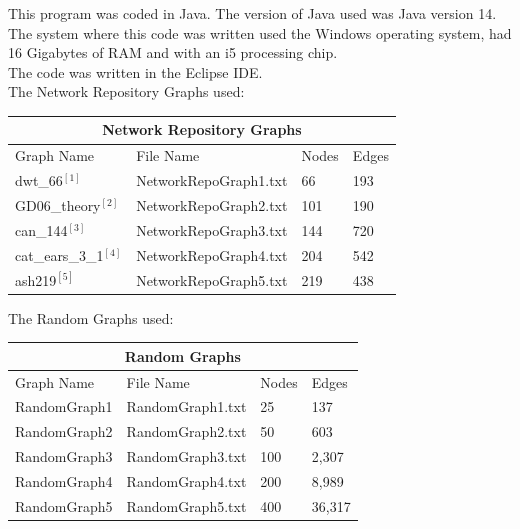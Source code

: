 \documentclass{article}
\begin{document}
\bigbreak
This program was coded in Java. The version of Java used was Java version 14.\\
The system where this code was written used the Windows operating system, had 16 Gigabytes of RAM and with an i5 processing chip. \\
The code was written in the Eclipse IDE. \\
The Network Repository Graphs used: \\
\begin{center}
 \begin{tabular}{||p{3cm} | p{4cm} | p{2cm}|p{2cm} ||} 
\hline
\multicolumn{4}{|c|}{Network Repository Graphs} \\

 \hline

 Graph Name& File Name & Nodes & Edges \\ [0.5ex] 
 \hline\hline
 dwt\_66$^{[1]}$ &NetworkRepoGraph1.txt & 66 &193  \\ 
 \hline
 GD06\_theory$^{[2]}$&NetworkRepoGraph2.txt  & 101 & 190\\
 \hline
can\_144$^{[3]}$ &NetworkRepoGraph3.txt  & 144 & 720 \\
 \hline
 cat\_ears\_3\_1$^{[4]}$&NetworkRepoGraph4.txt & 204 & 542\\
 \hline
  ash219$^{[5]}$&NetworkRepoGraph5.txt  & 219 &438\\ [1ex] 
 \hline
\end{tabular}
\end{center}

The Random Graphs used:\\
\begin{center}
 \begin{tabular}{||p{3cm} | p{4cm} | p{2cm}|p{2cm} ||} 
\hline
\multicolumn{4}{|c|}{Random Graphs} \\

 \hline

 Graph Name& File Name & Nodes & Edges \\ [0.5ex] 
 \hline\hline
 RandomGraph1 &RandomGraph1.txt & 25 & 137  \\ 
 \hline
 RandomGraph2 & RandomGraph2.txt  & 50 & 603 \\
 \hline
RandomGraph3 & RandomGraph3.txt  & 100 & 2,307 \\
 \hline
 RandomGraph4 & RandomGraph4.txt & 200 & 8,989\\
 \hline
RandomGraph5 & RandomGraph5.txt  & 400 & 36,317\\ [1ex] 
 \hline
\end{tabular}
\end{center}
\end{document}

